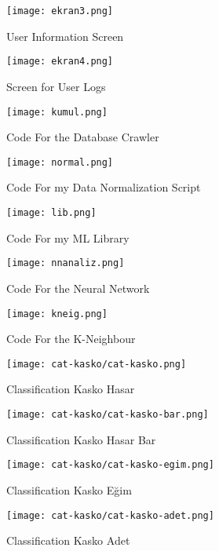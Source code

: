 \documentclass[titlepage, a4paper, 14pt]{extarticle} %
\begin{document}
\begin{figure}[H]
\centering
\texttt{[image: ekran3.png]}
\caption{User Information Screen}
\end{figure}

\begin{figure}[H]
\centering
\texttt{[image: ekran4.png]}
\caption{Screen for User Logs}
\end{figure}

\begin{figure}[H]
\centering
\texttt{[image: kumul.png]}
\caption{Code For the Database Crawler}
\end{figure}

\begin{figure}[H]
\centering
\texttt{[image: normal.png]}
\caption{Code For my Data Normalization Script}
\end{figure}

\begin{figure}[H]
\centering
\texttt{[image: lib.png]}
\caption{Code For my ML Library}
\end{figure}

\begin{figure}[H]
\centering
\texttt{[image: nnanaliz.png]}
\caption{Code For the Neural Network}
\end{figure}

\begin{figure}[H]
\centering
\texttt{[image: kneig.png]}
\caption{Code For the K-Neighbour}
\end{figure}





\begin{figure}[H]
\centering
\texttt{[image: cat-kasko/cat-kasko.png]}
\caption{Classification Kasko Hasar}
\end{figure}

\begin{figure}[H]
\centering
\texttt{[image: cat-kasko/cat-kasko-bar.png]}
\caption{Classification Kasko Hasar Bar}
\end{figure}

\begin{figure}[H]
\centering
\texttt{[image: cat-kasko/cat-kasko-egim.png]}
\caption{Classification Kasko Eğim}
\end{figure}

\begin{figure}[H]
\centering
\texttt{[image: cat-kasko/cat-kasko-adet.png]}
\caption{Classification Kasko Adet}
\end{figure}
\end{document}
